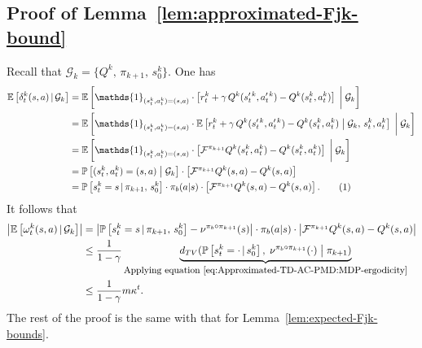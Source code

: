 \documentclass[10pt]{article}
\newcommand{\calF}{\mathcal{F}}
\newcommand{\calG}{\mathcal{G}}
\newcommand{\E}{\mathbb{E}}
\renewcommand{\P}{\mathbb{P}}
\newcommand{\ls}{\left}
\newcommand{\rs}{\right}
\newcommand\numberthis{\addtocounter{equation}{1}\tag{\theequation}}
\theoremstyle{plain}
\theoremstyle{definition}
\begin{document}
\subsection{Proof of Lemma~\ref{lem:approximated-Fjk-bound}}
\label{sec:pf:lem:approximated-Fjk-bound}
Recall that $\calG_k = \{ Q^k, \, \pi_{k+1}, \, s_0^k \}$. One has
\begin{align*}
    \E\ls[ \delta_t^k(s,a) \, | \, \calG_k \rs] &= \E\ls[ \mathds{1}_{(s_t^k, a_t^k) = (s,a)} \cdot \ls[ r_t^k + \gamma \, Q^k(s_t^{\prime\,k}, a_t^{\prime\,k}) - Q^k(s_t^k, a_t^k) \rs] \; \bigg | \; \calG_k \rs] \\
    &= \E\ls[ \mathds{1}_{(s_t^k, a_t^k) = (s,a)} \cdot \E \ls[ r_t^k + \gamma \, Q^k(s_t^{\prime\,k}, a_t^{\prime\,k}) - Q^k(s_t^k, a_t^k) \; \big | \; \calG_k, \, s_t^k, a_t^k \rs] \; \bigg | \; \calG_k \rs] \\
    &= \E \ls[ \mathds{1}_{(s_t^k, a_t^k)=(s,a)} \cdot \ls[ \calF^{\pi_{k+1}} Q^k(s_t^k, a_t^k) - Q^k(s_t^k, a_t^k) \rs] \; \bigg | \; \calG_k \rs] \\
    &= \P\ls[ (s_t^k, a_t^k)=(s,a) \; \big | \; \calG_k \rs] \cdot \ls[ \calF^{\pi_{k+1}} Q^k(s,a) - Q^k(s,a) \rs] \\
    &= \P\ls[ s_t^k = s\, | \, \pi_{k+1}, \, s_0^k \rs] \cdot \pi_b(a|s) \cdot \ls[ \calF^{\pi_{k+1}} Q^k(s,a) - Q^k(s,a) \rs]. \numberthis \label{eq:Approximated-TD-AC-PMD:delta-expectation}
\end{align*}
It follows that
\begin{align*}
    \ls| \E\ls[ \omega_t^k(s,a) \, | \, \calG_k \rs] \rs| &= \ls| \P\ls[ s_t^k=s \, | \, \pi_{k+1}, \, s_0^k \rs] - \nu^{\pi_b\circ\pi_{k+1}}(s) \rs| \cdot \pi_b(a|s) \cdot \ls| \calF^{\pi_{k+1}} Q^k(s,a) - Q^k(s,a) \rs| \\
    &\leq \frac{1}{1-\gamma} \underbrace{d_{TV}(\P\ls[ s_t^k=\cdot \, | \, s_0^k \rs], \; \nu^{\pi_b\circ\pi_{k+1}}(\cdot ) \; \big | \; \pi_{k+1})}_{\mbox{\small Applying equation~\eqref{eq:Approximated-TD-AC-PMD:MDP-ergodicity}}} \\
    &\leq \frac{1}{1-\gamma} m \kappa^t.
\end{align*}
{The rest of the proof is the same with that for Lemma~\ref{lem:expected-Fjk-bounds}.}
\end{document}
